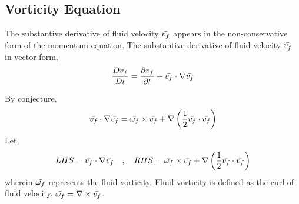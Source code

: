 \documentclass[class=report, 12pt, crop=false]{standalone}
\begin{document}
\begin{center}
\chapter{Vorticity Equation}
\begin{comment}

It is important that in the other works, the body acceleration is denoted as \b{F_b}, CHANGE IT TO \b{g_b}. This is important because \b{F_b} is misleading. We don't mean force, we mean the acceleration vector. So use \b{g_b} instead.


Results of a few reflections, we cannot just say that \f{D\rho}{Dt} = 0 for continuity. If we are to expand using \f{D\rho}{Dt} = 0, we will obtain the form, 0 = \f{\p\rho}{\p t} + v_i \f{\p\rho}{\p x_i}. The actual continuity governing equation: 0 = \f{\p\rho}{\p t} + \rho\f{\p}{\p x_j}(v_j) + v_j\f{\p\rho}{\p x_j}. Now if the divergence of velocity is zero, then the general continuity governing equation DEGENERATES into 0 = \f{D\rho}{Dt}. This means that that the observation 0 = \f{D\rho}{Dt} is only true for incompressible flow and could not represent the most general case of the continuity of fluids. Since an observation 0 = \f{D\rho}{Dt} fails to yield the most general case, then it is safe to assume that similar observations such as \b{a} = \f{D\b{v_f}}{Dt} will also likely fail to capture the full generality of the momentum governing equation.

Non-conervative form of the momentum equation referenced, please add the proof in a different part!

Please enforce consistency in notation. Please make sure that \b{v_f} is used when referring to fluid velocity throughout other documents. 



Things to automate:
    includegraphics commands

\end{comment}






The substantive derivative of fluid velocity $\bar{v_f}$ appears in the non-conservative form of the momentum equation. The substantive derivative of fluid velocity $\bar{v_f}$ in vector form,
$$\frac{D \bar{v_f}}{Dt} = \frac{\partial \bar{v_f}}{\partial t} + \bar{v_f}\cdot\nabla\bar{v_f}$$


By conjecture,
$$\bar{v_f}\cdot\nabla\bar{v_f} = \bar{\omega_f}\times \bar{v_f} + \nabla\left(\frac{1}{2}\bar{v_f}\cdot\bar{v_f}\right)$$
Let,
$$LHS = \bar{v_f}\cdot\nabla\bar{v_f} \quad,\quad RHS = \bar{\omega_f}\times \bar{v_f} + \nabla\left(\frac{1}{2}\bar{v_f}\cdot\bar{v_f}\right)$$
wherein $\bar{\omega_f}$ represents the fluid vorticity. Fluid vorticity is defined as the curl of fluid velocity, $\displaystyle \bar{\omega_f} = \nabla\times \bar{v_f}$.


\end{center}
\end{document}

